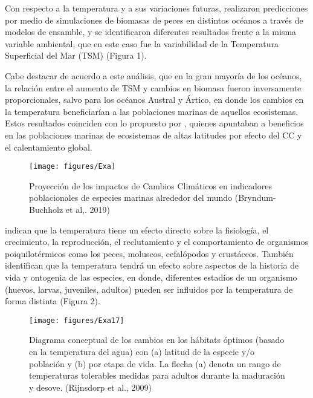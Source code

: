 \documentclass{umagthesis}
\begin{document}
Con respecto a la temperatura y a sus variaciones futuras, \autocite{Bryndum-Buchholz2019} realizaron predicciones por medio de simulaciones de biomasas de peces en distintos océanos a través de modelos de ensamble, y se identificaron diferentes resultados frente a la misma variable ambiental, que en este caso fue la variabilidad de la Temperatura Superficial del Mar (TSM) (Figura 1).

Cabe destacar de acuerdo a este análisis, que en la gran mayoría de los océanos, la relación entre el aumento de TSM y cambios en biomasa fueron inversamente proporcionales, salvo para los océanos Austral y Ártico, en donde los cambios en la temperatura beneficiarían a las poblaciones marinas de aquellos ecosistemas. Estos resultados coinciden con lo propuesto por \autocite{Koenigstein2016}, quienes apuntaban a beneficios en las poblaciones marinas de ecosistemas de altas latitudes por efecto del CC y el calentamiento global.

\pagebreak

\begin{figure}

{\centering \texttt{[image: figures/Exa]} 

}

\caption{Proyección de los impactos de Cambios Climáticos en indicadores poblacionales de especies marinas alrededor del mundo (Bryndum-Buchholz et al,. 2019)}\label{fig:unnamed-chunk-1}
\end{figure}

\autocite{Rijnsdorp2009} indican que la temperatura tiene un efecto directo sobre la fisiología, el crecimiento, la reproducción, el reclutamiento y el comportamiento de organismos poiquilotérmicos como los peces, moluscos, cefalópodos y crustáceos. También identifican que la temperatura tendrá un efecto sobre aspectos de la historia de vida y ontogenia de las especies, en donde, diferentes estadíos de un organismo (huevos, larvas, juveniles, adultos) pueden ser influidos por la temperatura de forma distinta (Figura 2).

\pagebreak

\begin{figure}

{\centering \texttt{[image: figures/Exa17]} 

}

\caption{Diagrama conceptual de los cambios en los hábitats óptimos (basado en la temperatura del agua) con (a) latitud de la especie y/o población y (b) por etapa de vida. La flecha (a) denota un rango de temperaturas tolerables medidas para adultos durante la maduración y desove. (Rijnsdorp et al., 2009)}\label{fig:unnamed-chunk-2}
\end{figure}
\end{document}
